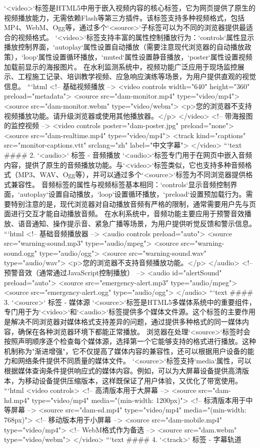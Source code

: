 `<video>`标签是HTML5中用于嵌入视频内容的核心标签，它为网页提供了原生的视频播放能力，无需依赖Flash等第三方插件。该标签支持多种视频格式，包括MP4、WebM、Ogg等，通过多个`<source>`子标签可以为不同的浏览器提供最适合的视频格式。 `<video>`标签支持丰富的属性控制播放行为：`controls`属性显示播放控制界面，`autoplay`属性设置自动播放（需要注意现代浏览器的自动播放政策），`loop`属性设置循环播放，`muted`属性设置静音播放，`poster`属性设置视频加载前显示的海报图片。 在水利监测系统中，视频功能广泛应用于现场监控展示、工程施工记录、培训教学视频、应急响应演练等场景，为用户提供直观的视觉信息。 ```html <!-- 基础视频播放 --> <video controls width="640" height="360" preload="metadata"> <source src="dam-monitor.mp4" type="video/mp4"> <source src="dam-monitor.webm" type="video/webm"> <p>您的浏览器不支持视频播放功能。请升级浏览器或使用其他播放器。</p> </video> <!-- 带海报图的监控视频 --> <video controls poster="dam-poster.jpg" preload="none"> <source src="dam-realtime.mp4" type="video/mp4"> <track kind="captions" src="monitor-captions.vtt" srclang="zh" label="中文字幕"> </video> ```text #### 2. `<audio>` 标签 - 音频播放 `<audio>`标签专门用于在网页中嵌入音频内容，提供了原生的音频播放功能。与`<video>`标签类似，它也支持多种音频格式（MP3、WAV、Ogg等），并可以通过多个`<source>`标签为不同浏览器提供格式兼容性。 音频标签的属性与视频标签基本相同：`controls`显示音频控制界面，`autoplay`设置自动播放，`loop`设置循环播放，`preload`设置预加载行为。需要特别注意的是，现代浏览器对自动播放音频有严格的限制，通常需要用户先与页面进行交互才能自动播放音频。 在水利系统中，音频功能主要应用于预警音效播放、语音通知、操作提示音、紧急广播等场景，为用户提供听觉反馈和警示信息。 ```html <!-- 基础音频播放器 --> <audio controls preload="auto"> <source src="warning-sound.mp3" type="audio/mpeg"> <source src="warning-sound.ogg" type="audio/ogg"> <source src="warning-sound.wav" type="audio/wav"> <p>您的浏览器不支持音频播放功能。</p> </audio> <!-- 预警音效（通常通过JavaScript控制播放） --> <audio id="alertSound" preload="auto"> <source src="emergency-alert.mp3" type="audio/mpeg"> <source src="emergency-alert.ogg" type="audio/ogg"> </audio> ```text #### 3. `<source>` 标签 - 媒体源 `<source>`标签是HTML5多媒体系统中的重要组件，专门用于为`<video>`和`<audio>`标签提供多个媒体文件源。这个标签的主要作用是解决不同浏览器对媒体格式支持差异的问题，通过提供多种格式的同一媒体内容，确保在各种浏览器环境下都能正常播放。 浏览器在处理`<source>`标签时会按照声明顺序逐个检查每个媒体源，选择第一个它能够支持的格式进行播放。这种机制称为"渐进增强"，它不仅提高了媒体内容的兼容性，还可以根据用户设备的能力和网络条件提供不同质量的媒体文件。 `<source>`标签支持`media`属性，可以根据媒体查询条件提供响应式的媒体内容。例如，可以为大屏幕设备提供高清版本，为移动设备提供压缩版本，这样既保证了用户体验，又优化了带宽使用。 ```html <video controls> <!-- 高清版本用于大屏幕 --> <source src="dam-hd.mp4" type="video/mp4" media="(min-width: 1200px)"> <!-- 标清版本用于中等屏幕 --> <source src="dam-sd.mp4" type="video/mp4" media="(min-width: 768px)"> <!-- 移动版本用于小屏幕 --> <source src="dam-mobile.mp4" type="video/mp4"> <!-- WebM格式作为备选 --> <source src="dam.webm" type="video/webm"> </video> ```text #### 4. `<track>` 标签 - 字幕轨道 